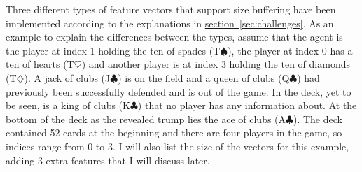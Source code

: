 \documentclass[a4paper,titlepage]{article}
\begin{document}
Three %
different types of feature vectors that support size buffering have been implemented according to the explanations in \hyperref[sec:challenges]{section~\ref*{sec:challenges}}.
As an example to explain the differences between the types, assume that the agent is the player at index 1 holding the ten of spades (T$\spadesuit$), the player at index 0 has a ten of hearts (T$\heartsuit$) and another player is at index 3 holding the ten of diamonds (T$\diamondsuit$). A jack of clubs (J$\clubsuit$) is on the field and a queen of clubs (Q$\clubsuit$) had previously been successfully defended and is out of the game. In the deck, yet to be seen, is a king of clubs (K$\clubsuit$) that no player has any information about. At the bottom of the deck as the revealed trump lies the ace of clubs (A$\clubsuit$). The deck contained 52 cards at the beginning and there are four players in the game, so indices range from 0 to 3. I will also list the size of the vectors for this example, adding 3 extra features that I will discuss later.
\end{document}
